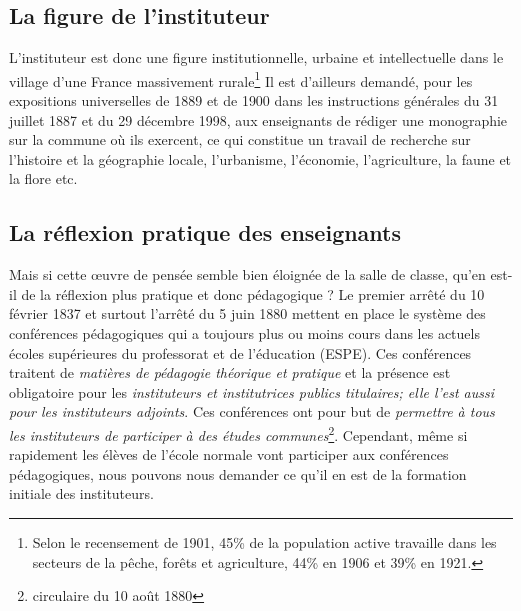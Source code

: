 \documentclass[a4paper,11pt]{article}
\begin{document}
			\subsection{La figure de l'instituteur}
				L'instituteur est donc une figure institutionnelle, urbaine et intellectuelle dans le village d'une France massivement rurale\footnote{Selon le recensement de 1901, 45\% de la population active travaille dans les secteurs de la pêche, forêts et agriculture, 44\% en 1906 et 39\% en 1921.} Il est d'ailleurs demandé, pour les expositions universelles de 1889 et de 1900 dans les instructions générales du 31 juillet 1887 et du 29 décembre 1998, aux enseignants de rédiger une monographie sur la commune où ils exercent, ce qui constitue un travail de recherche sur l'histoire et la géographie locale, l'urbanisme, l'économie, l'agriculture, la faune et la flore etc.   
			\subsection{La réflexion pratique des enseignants}
			Mais si cette œuvre de pensée semble bien éloignée de la salle de classe, qu'en est-il de la réflexion plus pratique et donc pédagogique ? Le premier arrêté du 10 février 1837 et surtout l'arrêté du 5 juin 1880 mettent en place le système des conférences pédagogiques qui a toujours plus ou moins cours dans les actuels écoles supérieures du professorat et de l'éducation (ESPE). Ces conférences traitent de \emph{matières de pédagogie théorique et pratique} et la présence est obligatoire pour les \emph{instituteurs et institutrices publics titulaires; elle l'est aussi pour les instituteurs adjoints}. Ces conférences ont pour but de \emph{permettre à tous les instituteurs de participer à des études communes}\footnote{circulaire du 10 août 1880}.
			Cependant, même si rapidement les élèves de l'école normale vont participer aux conférences pédagogiques, nous pouvons nous demander ce qu'il en est de la formation initiale des instituteurs. 
\end{document}
